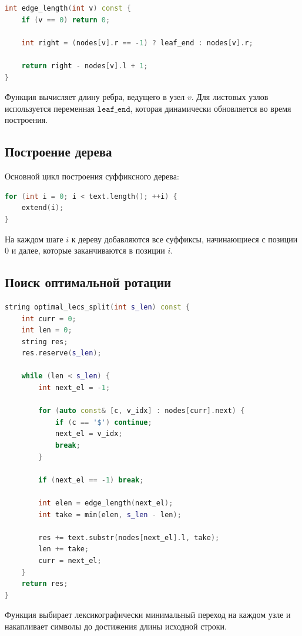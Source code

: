 \begin{lstlisting}[language=C++]
int edge_length(int v) const {
    if (v == 0) return 0;

    int right = (nodes[v].r == -1) ? leaf_end : nodes[v].r;

    return right - nodes[v].l + 1;
}
\end{lstlisting}

Функция вычисляет длину ребра, ведущего в узел $v$. Для листовых узлов используется переменная $\mathtt{leaf\_end}$, которая динамически обновляется во время построения.

\subsection{Построение дерева}

Основной цикл построения суффиксного дерева:

\begin{lstlisting}[language=C++]
for (int i = 0; i < text.length(); ++i) {
    extend(i);
}
\end{lstlisting}

На каждом шаге $i$ к дереву добавляются все суффиксы, начинающиеся с позиции 0 и далее, которые заканчиваются в позиции $i$.

\subsection{Поиск оптимальной ротации}

\begin{lstlisting}[language=C++]
string optimal_lecs_split(int s_len) const {
    int curr = 0;
    int len = 0;
    string res;
    res.reserve(s_len);

    while (len < s_len) {
        int next_el = -1;
        
        for (auto const& [c, v_idx] : nodes[curr].next) {
            if (c == '$') continue; 
            next_el = v_idx;
            break;
        }

        if (next_el == -1) break; 

        int elen = edge_length(next_el);
        int take = min(elen, s_len - len);

        res += text.substr(nodes[next_el].l, take);
        len += take;
        curr = next_el;
    }
    return res;
}
\end{lstlisting}

Функция выбирает лексикографически минимальный переход на каждом узле и накапливает символы до достижения длины исходной строки.

